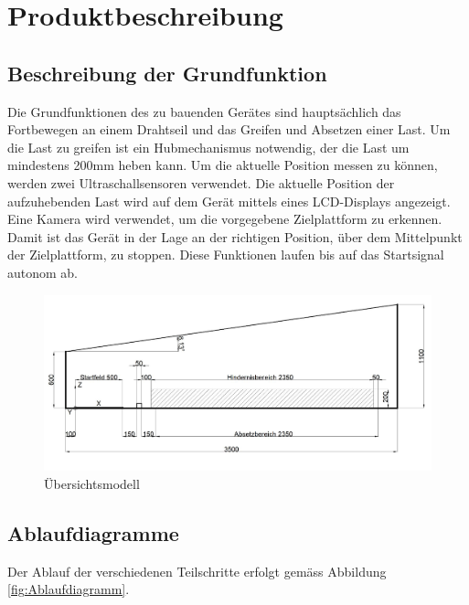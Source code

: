 \documentclass[a4paper]{report}
\begin{document}
\chapter{Produktbeschreibung}
\label{ch:Produktbeschreibung}

\section{Beschreibung der Grundfunktion}
\label{sec:GrundBeschrieb}
Die Grundfunktionen des zu bauenden Gerätes sind hauptsächlich das Fortbewegen an einem Drahtseil und das Greifen und Absetzen einer Last. Um die Last zu greifen ist ein Hubmechanismus notwendig, der die Last um mindestens 200mm heben kann. Um die aktuelle Position messen zu können, werden zwei Ultraschallsensoren verwendet. Die aktuelle Position der aufzuhebenden Last wird auf dem Gerät mittels eines LCD-Displays angezeigt. Eine Kamera wird verwendet, um die vorgegebene Zielplattform zu erkennen. Damit ist das Gerät in der Lage an der richtigen Position, über dem Mittelpunkt der Zielplattform, zu stoppen. Diese Funktionen laufen bis auf das Startsignal autonom ab.

\begin{figure}[h!]
	\includegraphics[keepaspectratio,width=\textwidth]{PrenFunktionsskizze}
	\caption{Übersichtsmodell}
	\label{fig:Funktionsskizze}
\end{figure}

\newpage
\section{Ablaufdiagramme}
\label{sec:Ablaufdiagramme}
Der Ablauf der verschiedenen Teilschritte erfolgt gemäss Abbildung \ref{fig:Ablaufdiagramm}.
\end{document}
